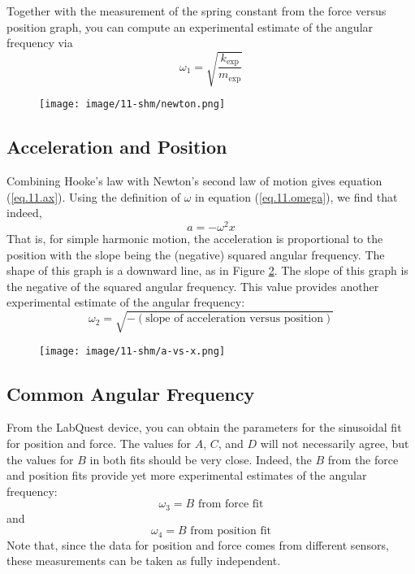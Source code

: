 Together with the measurement of the spring constant from the force versus position graph, you can compute an experimental estimate of the angular frequency via
\begin{equation}
    \omega_{1} = \sqrt{\frac{k_{\text{exp}}}{m_{\text{exp}}}}
\end{equation}
\begin{figure}
    \centering
    \texttt{[image: image/11-shm/newton.png]}
    \caption{}
    \label{figure.11.newton}
\end{figure}
\subsection{Acceleration and Position}
Combining Hooke's law with Newton's second law of motion gives equation (\ref{eq.11.ax}). Using the definition of $\omega$ in equation (\ref{eq.11.omega}), we find that indeed,
\begin{equation}
    a = -\omega^{2}x
\end{equation}
That is, for simple harmonic motion, the acceleration is proportional to the position with the slope being the (negative) squared angular frequency. The shape of this graph is a downward line, as in Figure \ref{figure.11.ax}. The slope of this graph is the negative of the squared angular frequency. This value provides another experimental estimate of the angular frequency:
\begin{equation}
    \omega_{2} = \sqrt{- (\text{slope of acceleration versus position})}
\end{equation}
\begin{figure}
    \centering
    \texttt{[image: image/11-shm/a-vs-x.png]}
    \caption{}
    \label{figure.11.ax}
\end{figure}
\subsection{Common Angular Frequency}
From the LabQuest device, you can obtain the parameters for the sinusoidal fit for position and force. The values for $A$, $C$, and $D$ will not necessarily agree, but the values for $B$ in both fits should be very close. Indeed, the $B$ from the force and position fits provide yet more experimental estimates of the angular frequency:
\begin{equation}
    \omega_{3} = B \text{ from force fit}
\end{equation}
and
\begin{equation}
    \omega_{4} = B \text{ from position fit}
\end{equation}
Note that, since the data for position and force comes from different sensors, these measurements can be taken as fully independent.


